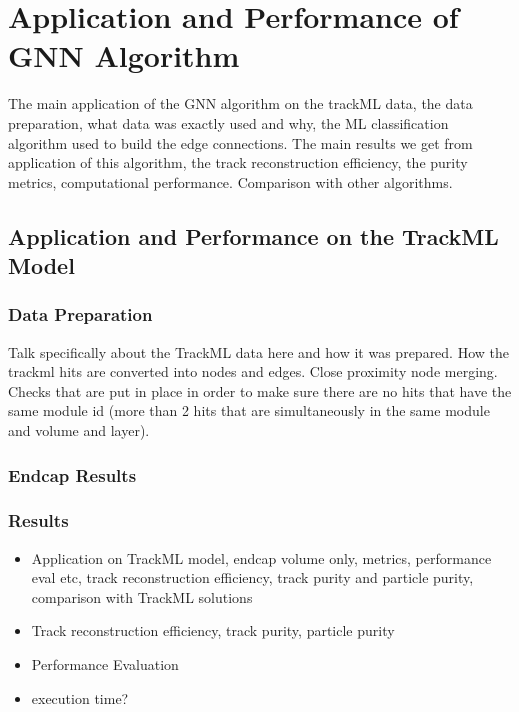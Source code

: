 
\chapter{Application and Performance of GNN Algorithm}
\label{chapter-6}

The main application of the GNN algorithm on the trackML data, the data preparation, what data was exactly used and why, the ML classification algorithm used to build the edge connections. The main results we get from application of this algorithm, the track reconstruction efficiency, the purity metrics, computational performance. Comparison with other algorithms.

\section{Application and Performance on the TrackML Model}

\subsection{Data Preparation}
Talk specifically about the TrackML data here and how it was prepared. How the trackml hits are converted into nodes and edges. Close proximity node merging. Checks that are put in place in order to make sure there are no hits that have the same module id (more than 2 hits that are simultaneously in the same module and volume and layer).

\subsection{Endcap Results}


\subsection{Results}
\begin{itemize}
    \item Application on TrackML model, endcap volume only, metrics, performance eval etc, track reconstruction efficiency, track purity and particle purity, comparison with TrackML solutions
    \item Track reconstruction efficiency, track purity, particle purity
    \item Performance Evaluation
    \item execution time?
\end{itemize}

